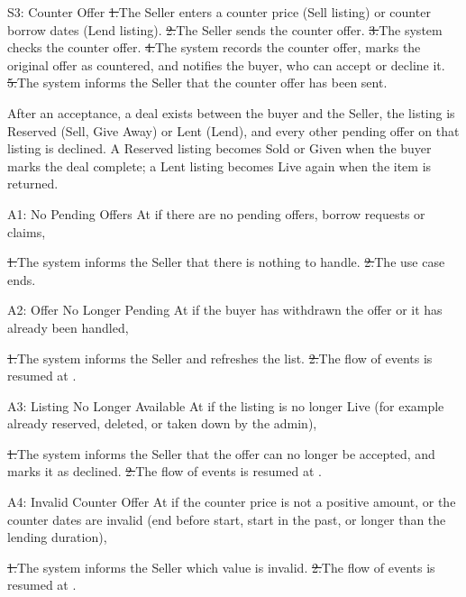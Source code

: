 \begin{flowblock}{S3: Counter Offer}
\st{1.}{The Seller enters a counter price (Sell listing) or counter borrow dates (Lend listing).}
\st{2.}{The Seller sends the counter offer.}
\st{3.}{The system checks the counter offer.}
\st{4.}{The system records the counter offer, marks the original offer as countered, and notifies the buyer, who can accept or decline it.}
\st{5.}{The system informs the Seller that the counter offer has been sent.}
\end{flowblock}
After an acceptance, a deal exists between the buyer and the Seller, the listing is Reserved (Sell, Give Away) or Lent (Lend), and every other pending offer on that listing is declined. A Reserved listing becomes Sold or Given when the buyer marks the deal complete; a Lent listing becomes Live again when the item is returned.\par
{}
\begin{flowblock}{A1: No Pending Offers}
At  if there are no pending offers, borrow requests or claims,\par
\st{1.}{The system informs the Seller that there is nothing to handle.}
\st{2.}{The use case ends.}
\end{flowblock}
\begin{flowblock}{A2: Offer No Longer Pending}
At  if the buyer has withdrawn the offer or it has already been handled,\par
\st{1.}{The system informs the Seller and refreshes the list.}
\st{2.}{The flow of events is resumed at .}
\end{flowblock}
\begin{flowblock}{A3: Listing No Longer Available}
At  if the listing is no longer Live (for example already reserved, deleted, or taken down by the admin),\par
\st{1.}{The system informs the Seller that the offer can no longer be accepted, and marks it as declined.}
\st{2.}{The flow of events is resumed at .}
\end{flowblock}
\begin{flowblock}{A4: Invalid Counter Offer}
At  if the counter price is not a positive amount, or the counter dates are invalid (end before start, start in the past, or longer than the lending duration),\par
\st{1.}{The system informs the Seller which value is invalid.}
\st{2.}{The flow of events is resumed at .}
\end{flowblock}
